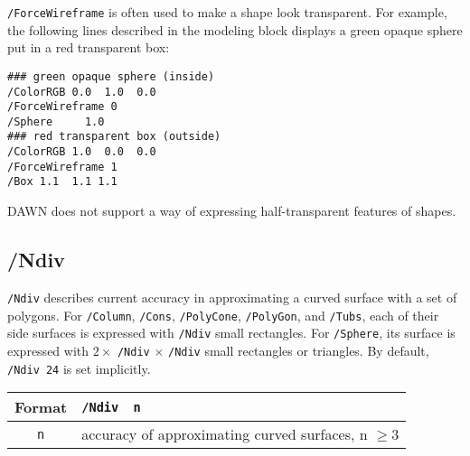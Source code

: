 \verb+/ForceWireframe+ is often used to make a shape look transparent. 
For example, the following lines described in the modeling block 
displays a green opaque sphere put in a red transparent box:
\begin{verbatim}
### green opaque sphere (inside)
/ColorRGB 0.0  1.0  0.0 
/ForceWireframe 0
/Sphere     1.0
### red transparent box (outside)
/ColorRGB 1.0  0.0  0.0 
/ForceWireframe 1
/Box 1.1  1.1 1.1
\end{verbatim}
\vspace{.20in}

\noindent
DAWN does not support a way of expressing 
half-transparent features of shapes.  


\subsection{/Ndiv}  
\verb+/Ndiv+ describes current accuracy in approximating a curved surface
with a set of polygons.
For \verb+/Column+, \verb+/Cons+, \verb+/PolyCone+, \verb+/PolyGon+,   
and \verb+/Tubs+,  
each of their side surfaces is expressed with \verb+/Ndiv+ small rectangles.  
For \verb+/Sphere+, its surface is expressed with  
$2\times$ \verb+/Ndiv+ $\times$ \verb+/Ndiv+ small rectangles or triangles.
By default, \verb+/Ndiv 24+ is set implicitly. 
\vspace{.20in}

\begin{tabular}{|c|l|}
\hline%
Format     & \verb+/Ndiv  n+\\
\hline%
\verb+n+   & accuracy of approximating curved surfaces, n $\geq 3$\\
\hline%
\end{tabular}


%



